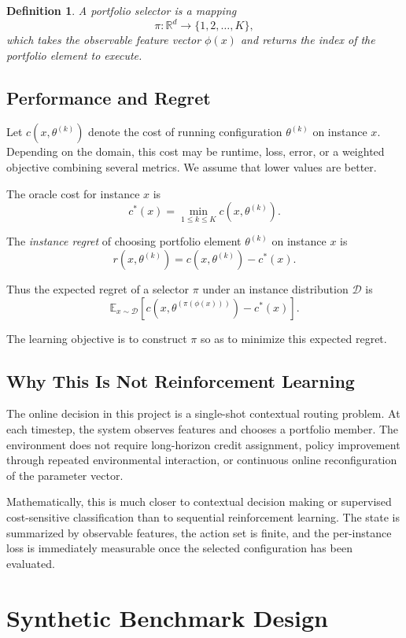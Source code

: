 \documentclass[11pt]{report}
\newtheorem{definition}{Definition}[chapter]
\begin{document}
\begin{definition}
A portfolio selector is a mapping
\[
\pi : \mathbb{R}^d \to \{1,2,\dots,K\},
\]
which takes the observable feature vector $\phi(x)$ and returns the index of the portfolio element to execute.
\end{definition}

\section{Performance and Regret}

Let $c(x, \theta^{(k)})$ denote the cost of running configuration $\theta^{(k)}$ on instance $x$. Depending on the domain, this cost may be runtime, loss, error, or a weighted objective combining several metrics. We assume that lower values are better.

The oracle cost for instance $x$ is
\[
c^*(x) = \min_{1 \le k \le K} c(x, \theta^{(k)}).
\]

The \emph{instance regret} of choosing portfolio element $\theta^{(k)}$ on instance $x$ is
\[
r(x, \theta^{(k)}) = c(x, \theta^{(k)}) - c^*(x).
\]

Thus the expected regret of a selector $\pi$ under an instance distribution $\mathcal{D}$ is
\[
\mathbb{E}_{x \sim \mathcal{D}}
\left[
c(x, \theta^{(\pi(\phi(x)))}) - c^*(x)
\right].
\]

The learning objective is to construct $\pi$ so as to minimize this expected regret.

\section{Why This Is Not Reinforcement Learning}

The online decision in this project is a single-shot contextual routing problem. At each timestep, the system observes features and chooses a portfolio member. The environment does not require long-horizon credit assignment, policy improvement through repeated environmental interaction, or continuous online reconfiguration of the parameter vector.

Mathematically, this is much closer to contextual decision making or supervised cost-sensitive classification than to sequential reinforcement learning. The state is summarized by observable features, the action set is finite, and the per-instance loss is immediately measurable once the selected configuration has been evaluated.

\chapter{Synthetic Benchmark Design}
\end{document}
